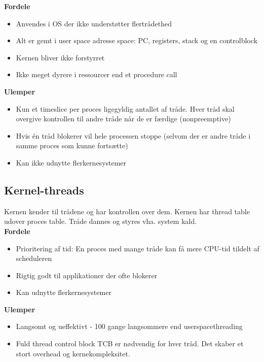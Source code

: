 \textbf{Fordele}
\begin{itemize}
	\item Anvendes i OS der ikke understøtter flertrådethed
	\item Alt er gemt i user space adresse space: PC, registers, stack og en controlblock
	\item Kernen bliver ikke forstyrret 
	\item Ikke meget dyrere i ressourcer end et procedure call
\end{itemize}

\textbf{Ulemper}\\
\begin{itemize}
	\item Kun et timeslice per proces ligegyldig antallet af tråde. Hver tråd skal overgive kontrollen til andre tråde når de er færdige (nonpreemptive)
	\item Hvis én tråd blokerer vil hele processen stoppe (selvom der er andre tråde i samme proces som kunne fortsætte)
	\item Kan ikke udnytte flerkernesystemer
\end{itemize}

\subsection{Kernel-threads}
Kernen kender til trådene og har kontrollen over dem. Kernen har thread table udover proces table. Tråde dannes og styres vha. system kald. \\

\textbf{Fordele}
\begin{itemize}
	\item Prioritering af tid: En proces med mange tråde kan få mere CPU-tid tildelt af scheduleren
	\item Rigtig godt til applikationer der ofte blokerer
	\item Kan udnytte flerkernesystemer
\end{itemize}

\textbf{Ulemper}
\begin{itemize}
	\item Langsomt og ueffektivt - 100 gange langsommere end userspacethreading \item Fuld thread control block TCB er nødvendig for hver tråd. Det skaber et stort overhead og kernekompleksitet.
\end{itemize}




